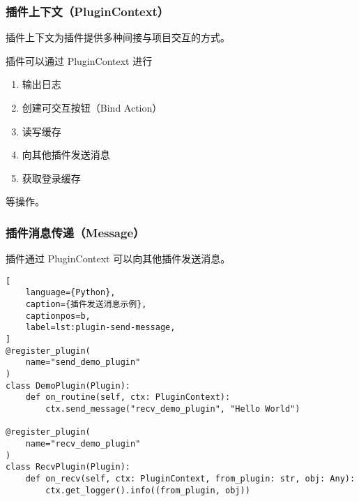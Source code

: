 \subsubsection{插件上下文（PluginContext）}
插件上下文为插件提供多种间接与项目交互的方式。

插件可以通过 PluginContext 进行
\begin{enumerate}
    \item 输出日志
    \item 创建可交互按钮（Bind Action）
    \item 读写缓存
    \item 向其他插件发送消息
    \item 获取登录缓存
\end{enumerate}
等操作。

\subsubsection{插件消息传递（Message）}
插件通过 PluginContext 可以向其他插件发送消息。

\begin{lstlisting}[
    language={Python},
    caption={插件发送消息示例},
    captionpos=b,
    label=lst:plugin-send-message,
]
@register_plugin(
    name="send_demo_plugin"
)
class DemoPlugin(Plugin):
    def on_routine(self, ctx: PluginContext):
        ctx.send_message("recv_demo_plugin", "Hello World")

@register_plugin(
    name="recv_demo_plugin"
)
class RecvPlugin(Plugin):
    def on_recv(self, ctx: PluginContext, from_plugin: str, obj: Any):
        ctx.get_logger().info((from_plugin, obj))\end{lstlisting}
